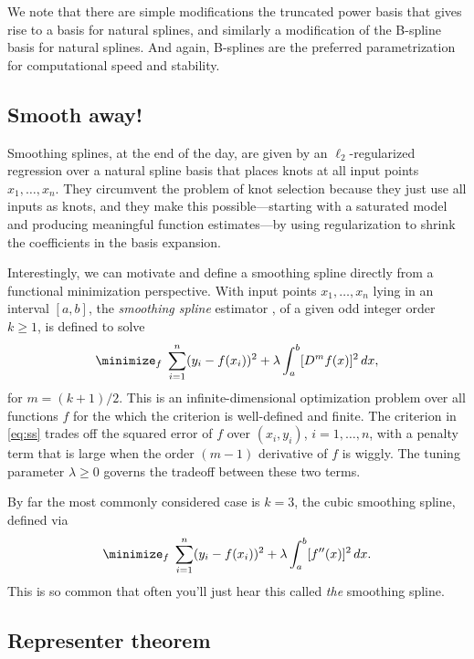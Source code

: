 \documentclass{article}
\begin{document}
We note that there are simple modifications the truncated power basis that gives
rise to a basis for natural splines, and similarly a modification of the
B-spline basis for natural splines. And again, B-splines are the preferred
parametrization for computational speed and stability. 

\subsection{Smooth away!}

Smoothing splines, at the end of the day, are given by an $\ell_2$-regularized
regression over a natural spline basis that places knots at all input points 
$x_1,\dots,x_n$. They circumvent the problem of knot selection because they
just use all inputs as knots, and they make this possible---starting with a 
saturated model and producing meaningful function estimates---by using
regularization to shrink the coefficients in the basis expansion.

Interestingly, we can motivate and define a smoothing spline directly from a
functional minimization perspective. With input points $x_1,\dots,x_n$ lying in 
an interval $[a,b]$, the \emph{smoothing spline} estimator \smash{$\hf$}, of a
given odd integer order $k \geq 1$, is defined to solve   
\begin{equation}
\label{eq:ss}
\minimize_f \; \sum_{i=1}^n (y_i - f(x_i))^2 + \lambda \int_a^b [D^m f(x)]^2 \,
dx, 
\end{equation}
for $m = (k+1)/2$. This is an infinite-dimensional optimization problem over all
functions $f$ for the which the criterion is well-defined and finite. The
criterion in \eqref{eq:ss} trades off the squared error of $f$ over $(x_i,y_i)$,
$i=1,\dots,n$, with a penalty term that is large when the order $(m-1)$
derivative of $f$ is wiggly. The tuning parameter $\lambda \geq 0$ governs the
tradeoff between these two terms.

By far the most commonly considered case is $k=3$, the cubic smoothing spline,
defined via 
\begin{equation}
\label{eq:ss_cubic}
\minimize_f \; \sum_{i=1}^n (y_i - f(x_i))^2 + \lambda \int_a^b [f''(x)]^2 \, dx.
\end{equation}
This is so common that often you'll just hear this called \emph{the} smoothing
spline. 

\subsection{Representer theorem}
\end{document}
